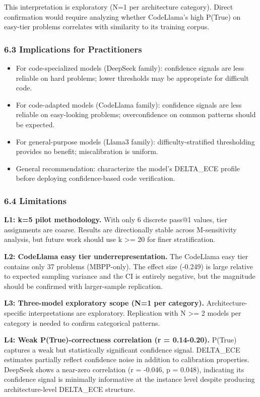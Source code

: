 This interpretation is exploratory (N=1 per architecture category). Direct confirmation would require analyzing whether CodeLlama's high P(True) on easy-tier problems correlates with similarity to its training corpus.

\subsubsection{6.3 Implications for Practitioners}

\begin{itemize}
\item For code-specialized models (DeepSeek family): confidence signals are less reliable on hard problems; lower thresholds may be appropriate for difficult code.
\item For code-adapted models (CodeLlama family): confidence signals are less reliable on easy-looking problems; overconfidence on common patterns should be expected.
\item For general-purpose models (Llama3 family): difficulty-stratified thresholding provides no benefit; miscalibration is uniform.
\item General recommendation: characterize the model's DELTA\_ECE profile before deploying confidence-based code verification.
\end{itemize}

\subsubsection{6.4 Limitations}

\textbf{L1: k=5 pilot methodology.} With only 6 discrete pass@1 values, tier assignments are coarse. Results are directionally stable across M-sensitivity analysis, but future work should use k >= 20 for finer stratification.

\textbf{L2: CodeLlama easy tier underrepresentation.} The CodeLlama easy tier contains only 37 problems (MBPP-only). The effect size (-0.249) is large relative to expected sampling variance and the CI is entirely negative, but the magnitude should be confirmed with larger-sample replication.

\textbf{L3: Three-model exploratory scope (N=1 per category).} Architecture-specific interpretations are exploratory. Replication with N >= 2 models per category is needed to confirm categorical patterns.

\textbf{L4: Weak P(True)-correctness correlation (r = 0.14-0.20).} P(True) captures a weak but statistically significant confidence signal. DELTA\_ECE estimates partially reflect confidence noise in addition to calibration properties. DeepSeek shows a near-zero correlation (r = -0.046, p = 0.048), indicating its confidence signal is minimally informative at the instance level despite producing architecture-level DELTA\_ECE structure.

